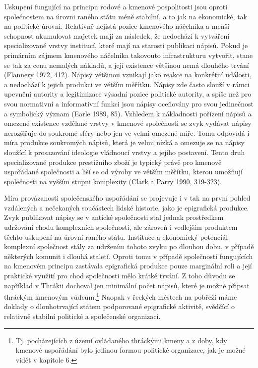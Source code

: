 Uskupení fungující na principu rodové a kmenové pospolitosti jsou oproti společnostem na úrovni raného státu méně stabilní, a to jak na ekonomické, tak na politické úrovni. Relativně nejistá pozice kmenového náčelníka a menší schopnost akumulovat majetek mají za následek, že nedochází k vytváření specializované vrstvy institucí, které mají na starosti publikaci nápisů. Pokud je primárním zájmem kmenového náčelníka takovouto infrastrukturu vytvořit, stane se tak za cenu nemalých nákladů, a její existence většinou nemá dlouhého trvání (Flannery 1972, 412). Nápisy většinou vznikají jako reakce na konkrétní události, a nedochází k jejich produkci ve větším měřítku. Nápisy zde často slouží v rámci upevnění autority a legitimizace výsadní pozice politické autority, a spíše než pro svou normativní a informativní funkci jsou nápisy oceňovány pro svou jedinečnost a symbolický význam (Earle 1989, 85). Vzhledem k nákladnosti pořízení nápisů a omezené existence vzdělané vrstvy v kmenové společnosti se zvyk vydávat nápisy nerozšiřuje do soukromé sféry nebo jen ve velmi omezené míře. Tomu odpovídá i míra produkce soukromých nápisů, která je velmi nízká a omezuje se na nápisy sloužící k prosazování ideologie vládnoucí vrstvy a jejího postavení. Tento druh specializované produkce prestižního zboží je typický právě pro kmenově uspořádané společnosti a liší se od výroby ve větším měřítku, kterou umožňují společnosti na vyšším stupni komplexity (Clark a Parry 1990, 319-323).

Míra provázanosti společenského uspořádání se projevuje i v tak na první pohled vzdálených a nečekaných součástech lidské historie, jako je epigrafická produkce. Zvyk publikovat nápisy se v antické společnosti stal jednak prostředkem udržování chodu komplexních společností, ale zároveň i vedlejším produktem těchto uskupení na úrovni raného státu. Instituce a ekonomický potenciál komplexní společnost stály za udržením tohoto zvyku po dlouhou dobu, v případě některých komunit i dlouhá staletí. Oproti tomu v případě společností fungujících na kmenovém principu zastávala epigrafická produkce pouze marginální roli a její praktické využití pro chod společnosti mělo krátké trvání. Z toho důvodu se například v Thrákii dochoval jen minimální počet nápisů, které je možné připsat thráckým kmenovým vůdcům.\footnote{Tj. pocházejících z území ovládaného thráckými kmeny a z doby, kdy kmenové uspořádání bylo jedinou formou politické organizace, jak je možné vidět v kapitole 6.} Naopak v řeckých městech na pobřeží máme doklady o dlouhotrvající státem podporované epigrafické aktivitě, svědčící o relativně stabilní politické a společenské organizaci.


